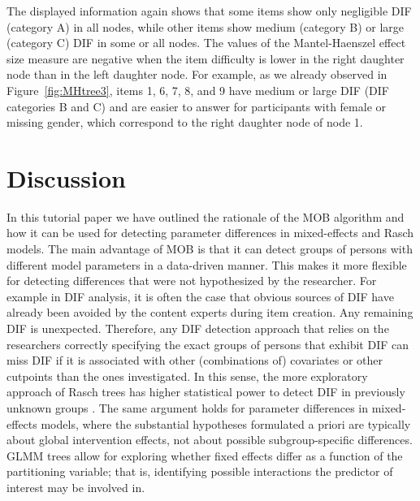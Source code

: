 \documentclass[doc,floatsintext,natbib]{apa7}
\begin{document}
The displayed information again shows that some items show only negligible DIF (category A) in all nodes, while other items show medium (category B) or large (category C) DIF in some or all nodes. The values of the Mantel-Haenszel effect size measure are negative when the item difficulty is lower in the right daughter node than in the left daughter node. For example, as we already observed in Figure~\ref{fig:MHtree3}, items 1, 6, 7, 8, and 9 have medium or large DIF (DIF categories B and C) and are  easier to answer %
for participants with female or missing gender, which correspond to the right daughter node of node 1. %


\FloatBarrier
\section{Discussion}
\label{discussion}

In this tutorial paper we have outlined the rationale of the MOB algorithm and how it can be used for detecting parameter differences in mixed-effects and Rasch models. The main advantage of MOB is that it can detect groups of persons with different model parameters in a data-driven manner. This makes it more flexible for detecting differences that were not hypothesized by the researcher. For example in DIF analysis, it is often the case that obvious sources of DIF have already been avoided by the content experts during item creation. Any remaining DIF is unexpected. Therefore, any DIF detection approach that relies on the researchers correctly specifying the exact groups of persons that exhibit DIF can miss DIF if it is associated with other (combinations of) covariates or other cutpoints than the ones investigated. In this sense, the more exploratory approach of Rasch trees has higher statistical power to detect DIF in previously unknown groups \citep{StrKopZei:2015:P}. The same argument holds for parameter differences in mixed-effects models, where the substantial hypotheses formulated a priori are typically about global intervention effects, not about possible subgroup-specific differences. GLMM trees allow for exploring whether fixed effects differ as a function of the partitioning variable; that is, identifying possible interactions the predictor of interest may be involved in.
\end{document}
